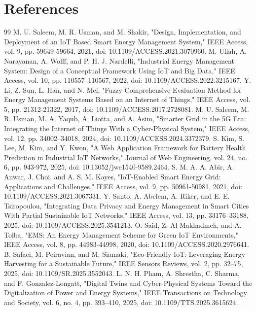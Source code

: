 \documentclass[technologies,article,submit,pdftex,moreauthors]{Definitions/mdpi}
\begin{document}
\section*{References}
\begin{thebibliography}{99}
 M. U. Saleem, M. R. Usman, and M. Shakir, "Design, Implementation, and Deployment of an IoT Based Smart Energy Management System," IEEE Access, vol. 9, pp. 59649-59664, 2021, doi: 10.1109/ACCESS.2021.3070960.
 M. Ullah, A. Narayanan, A. Wolff, and P. H. J. Nardelli, "Industrial Energy Management System: Design of a Conceptual Framework Using IoT and Big Data," IEEE Access, vol. 10, pp. 110557--110567, 2022, doi: 10.1109/ACCESS.2022.3215167.
 Y. Li, Z. Sun, L. Han, and N. Mei, "Fuzzy Comprehensive Evaluation Method for Energy Management Systems Based on an Internet of Things," IEEE Access, vol. 5, pp. 21312-21322, 2017, doi: 10.1109/ACCESS.2017.2728081.
 M. U. Saleem, M. R. Usman, M. A. Yaqub, A. Liotta, and A. Asim, "Smarter Grid in the 5G Era: Integrating the Internet of Things With a Cyber-Physical System," IEEE Access, vol. 12, pp. 34002--34018, 2024, doi: 10.1109/ACCESS.2024.3372379.
 S. Kim, S. Lee, M. Kim, and Y. Kwon, "A Web Application Framework for Battery Health Prediction in Industrial IoT Networks," Journal of Web Engineering, vol. 24, no. 6, pp. 943-972, 2025, doi: 10.13052/jwe1540-9589.2464.
 S. M. A. A. Abir, A. Anwar, J. Choi, and A. S. M. Kayes, "IoT-Enabled Smart Energy Grid: Applications and Challenges," IEEE Access, vol. 9, pp. 50961-50981, 2021, doi: 10.1109/ACCESS.2021.3067331.
 Y. Santo, A. Abelem, A. Riker, and E. E. Tsiropoulou, "Integrating Data Privacy and Energy Management in Smart Cities With Partial Sustainable IoT Networks," IEEE Access, vol. 13, pp. 33176--33188, 2025, doi: 10.1109/ACCESS.2025.3541213.
 O. Said, Z. Al-Makhadmeh, and A. Tolba, "EMS: An Energy Management Scheme for Green IoT Environments," IEEE Access, vol. 8, pp. 44983-44998, 2020, doi: 10.1109/ACCESS.2020.2976641.
 B. Safaei, M. Peiravian, and M. Siamaki, "Eco-Friendly IoT: Leveraging Energy Harvesting for a Sustainable Future," IEEE Sensors Reviews, vol. 2, pp. 32--75, 2025, doi: 10.1109/SR.2025.3552043.
 L. N. H. Pham, A. Shrestha, C. Sharma, and F. Gonzalez-Longatt, "Digital Twins and Cyber-Physical Systems Toward the Digitalization of Power and Energy Systems," IEEE Transactions on Technology and Society, vol. 6, no. 4, pp. 393--410, 2025, doi: 10.1109/TTS.2025.3615624.

\end{thebibliography}
\end{document}
